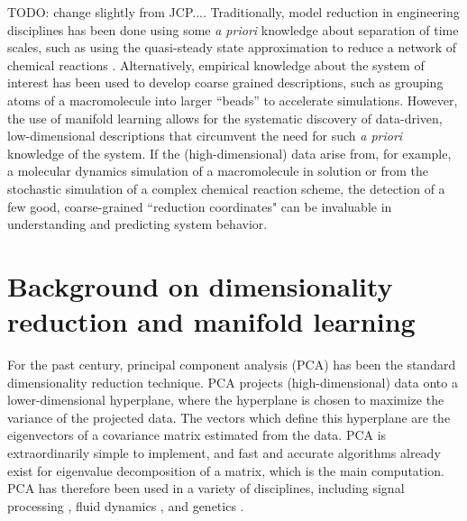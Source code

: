 %
%
%
%
%
%
%
TODO: change slightly from JCP....
Traditionally, model reduction in engineering disciplines has been done using some {\em a priori} knowledge about separation of time scales,
such as using the quasi-steady state approximation to reduce a network of chemical reactions \cite{bowen1963singular}.
%
Alternatively, empirical knowledge about the system of interest has been used to develop coarse grained descriptions,
such as grouping atoms of a macromolecule into larger ``beads'' to accelerate simulations\cite{monticelli2008martini, spiga2013electrostatic,izvekov2005systematic, saunders2013coarse}.
%
However, the use of manifold learning allows for the systematic discovery of data-driven, low-dimensional descriptions that circumvent the need for such {\em a priori} knowledge of the system.
%
If the (high-dimensional) data arise from, for example, a
molecular dynamics simulation of a macromolecule in solution or from the stochastic
simulation of a complex chemical reaction scheme, the detection of a few good, coarse-grained
``reduction coordinates" can be invaluable in understanding and predicting system behavior.
%


\section{Background on dimensionality reduction and manifold learning} \label{sec:background}


For the past century, principal component analysis (PCA) \cite{shlens2005tutorial} has been the standard dimensionality reduction technique.
%
PCA projects (high-dimensional) data onto a lower-dimensional hyperplane, where the hyperplane is chosen to maximize the variance of the projected data. 
%
The vectors which define this hyperplane are the eigenvectors of a covariance matrix estimated from the data. 
%
PCA is extraordinarily simple to implement, and fast and accurate algorithms already exist for eigenvalue decomposition of a matrix, which is the main computation.
%
PCA has therefore been used in a variety of disciplines, including signal processing \cite{...},  fluid dynamics \cite{...}, and genetics \cite{...}. 

